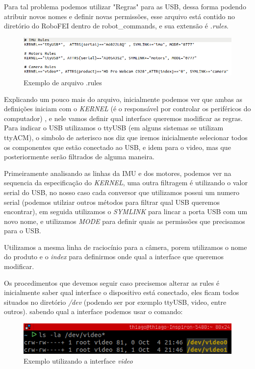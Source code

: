 		Para tal problema podemos utilizar "Regras" para as USB, dessa forma podendo atribuir novos nomes e definir novas permissões, esse arquivo está contido no diretório do RoboFEI dentro de robot\_commands, e sua extensão é \textit{.rules}.
		
		\begin{figure}[H]
			\centering
			\caption{Exemplo de arquivo .rules}
			\includegraphics[scale=0.6]{sections/programacao/procedimentos/imagens/rules_file.png}
		\end{figure}
	
		Explicando um pouco mais do arquivo, inicialmente podemos ver que ambas as definições iniciam com o \textit{KERNEL} (é o responsável por controlar os periféricos do computador) , e nele vamos definir qual interface queremos modificar as regras. Para indicar o USB utilizamos o ttyUSB (em alguns sistemas se utilizam ttyACM), o simbolo de asterisco nos diz que iremos inicialmente selecionar todos os componentes que estão conectado ao USB, e idem para o video, mas que posteriormente serão filtrados de alguma maneira.
		
		Primeiramente analisando as linhas da IMU e dos motores, podemos ver na sequencia da especificação do \textit{KERNEL}, uma outra filtragem é utilizando o valor serial do USB, no nosso caso cada conversor que utilizamos possui um numero serial (podemos utilziar outros métodos para filtrar qual USB queremos encontrar), em seguida utilizamos o \textit{SYMLINK} para lincar a porta USB com um novo nome, e utilizamos \textit{MODE} para definir quais as permissões que precisamos para o USB.
		
		Utilizamos a mesma linha de raciocínio para a câmera, porem utilizamos o nome do produto e o \textit{index} para definirmos onde qual a interface que queremos modificar.
		
		Os procedimentos que devemos seguir caso precisemos alterar as rules é inicialmente saber qual interface o dispositivo está conectado, eles ficam todos situados no diretório \textit{/dev} (podendo ser por exemplo ttyUSB, video, entre outros). sabendo qual a interface podemos usar o comando:
		
		\begin{figure}[H]
			\centering
			\caption{Exemplo utilizando a interface \textit{video}}
			\includegraphics[scale=0.6]{sections/programacao/procedimentos/imagens/interface_list.png}
		\end{figure}
		
